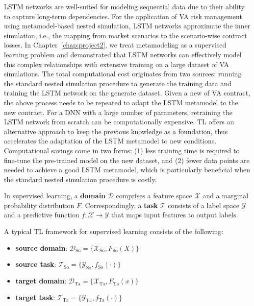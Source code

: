 LSTM networks are well-suited for modeling sequential data due to their ability to capture long-term dependencies.
For the application of VA risk management using metamodel-based nested simulation, LSTM networks approximate the inner simulation, i.e., the mapping from market scenarios to the scenario-wise contract losses.
In Chapter~\ref{chap:project2}, we treat metamodeling as a supervised learning problem and demonstrated that LSTM networks can effectively model this complex relationships with extensive training on a large dataset of VA simulations.
The total computational cost originates from two sources: running the standard nested simulation procedure to generate the training data and training the LSTM network on the generate dataset.
Given a new of VA contract, the above process needs to be repeated to adapt the LSTM metamodel to the new contract.
For a DNN with a large number of parameters, retraining the LSTM network from scratch can be computationally expensive.
TL offers an alternative approach to keep the previous knowledge as a foundation, thus accelerates the adaptation of the LSTM metamodel to new conditions.
Computational savings come in two forms: (1) less training time is required to fine-tune the pre-trained model on the new dataset, and (2) fewer data points are needed to achieve a good LSTM metamodel, which is particularly beneficial when the standard nested simulation procedure is costly.

In supervised learning, a \textbf{domain} $\mathcal{D}$ comprises a feature space $\mathcal{X}$ and a marginal probability distribution $F$. Correspondingly, a \textbf{task} $\mathcal{T}$ consists of a label space $\mathcal{Y}$ and a predictive function $f: \mathcal{X} \rightarrow \mathcal{Y}$ that maps input features to output labels.

A typical TL framework for supervised learning consists of the following:
\begin{itemize}
    \item   \textbf{source domain}: $\mathcal{D}_{\text{So}} = \{\mathcal{X}_{\text{So}}, F_{\text{So}}(X)\}$
    \item   \textbf{source task}: $\mathcal{T}_{\text{So}} = \{\mathcal{Y}_{\text{So}}, f_{\text{So}}(\cdot)\}$
    \item   \textbf{target domain}: $\mathcal{D}_{\text{Ta}} = \{\mathcal{X}_{\text{Ta}}, F_{\text{Ta}}(x)\}$
    \item   \textbf{target task}: $\mathcal{T}_{\text{Ta}} = \{\mathcal{Y}_{\text{Ta}}, f_{\text{Ta}}(\cdot)\}$
\end{itemize}

